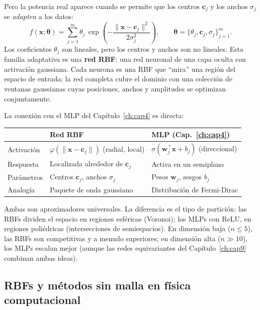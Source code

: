 Pero la potencia real aparece cuando se permite que los centros $\bm{c}_j$
y los anchos $\sigma_j$ se \emph{adapten} a los datos:
\begin{equation}
  f(\bm{x};\bm{\theta}) = \sum_{j=1}^m \theta_j\,
  \exp\!\left(-\frac{\|\bm{x}-\bm{c}_j\|^2}{2\sigma_j^2}\right),
  \qquad
  \bm{\theta} = \{\theta_j, \bm{c}_j, \sigma_j\}_{j=1}^m.
  \label{eq:rbf_adaptativa}
\end{equation}
Los coeficientes $\theta_j$ son lineales, pero los centros y anchos son
no lineales. Esta familia adaptativa es una \textbf{red RBF}: una red
neuronal de una capa oculta con activación gaussiana. Cada neurona es una
RBF que ``mira'' una región del espacio de entrada; la red completa cubre
el dominio con una colección de ventanas gaussianas cuyas posiciones,
anchos y amplitudes se optimizan conjuntamente.

La conexión con el MLP del Capítulo~\ref{ch:cap4} es directa:

\begin{center}
\begin{tabular}{lll}
\toprule
 & \textbf{Red RBF} & \textbf{MLP (Cap.~\ref{ch:cap4})} \\
\midrule
Activación & $\varphi(\|\bm{x}-\bm{c}_j\|)$ (radial, local) &
  $\sigma(\bm{w}_j^\top\bm{x}+b_j)$ (direccional) \\
Respuesta & Localizada alrededor de $\bm{c}_j$ &
  Activa en un semiplano \\
Parámetros & Centros $\bm{c}_j$, anchos $\sigma_j$ &
  Pesos $\bm{w}_j$, sesgos $b_j$ \\
Analogía & Paquete de onda gaussiano &
  Distribución de Fermi-Dirac \\
\bottomrule
\end{tabular}
\end{center}

Ambas son aproximadores universales. La diferencia es el tipo de partición:
las RBFs dividen el espacio en regiones esféricas (Voronoi); los MLPs con
ReLU, en regiones poliédricas (intersecciones de semiespacios). En
dimensión baja ($n \leq 5$), las RBFs son competitivas y a menudo
superiores; en dimensión alta ($n \gg 10$), los MLPs escalan mejor
(aunque las redes equivariantes del Capítulo~\ref{ch:cap9} combinan
ambas ideas).

\subsection{RBFs y métodos sin malla en física computacional}
\label{subsec:meshless}

